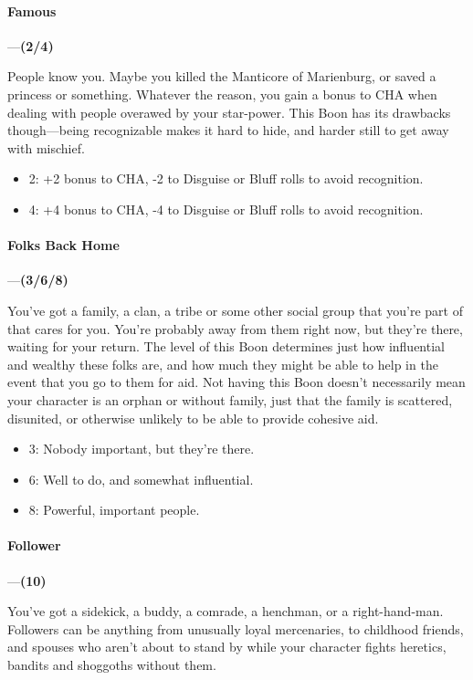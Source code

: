 \documentclass[oneside,11pt,english]{book}
\begin{document}
\paragraph{\label{boon:Famous}Famous}---\quad\textbf{(2/4)}\par
People know you. Maybe you killed the Manticore of Marienburg, or saved a princess or something. 
Whatever the reason, you gain a bonus to CHA when dealing with people overawed by your star-power. 
This Boon has its drawbacks though—being recognizable makes it hard to hide, and harder still to get 
away with mischief.
\begin{itemize}
\item 2: +2 bonus to CHA, -2 to Disguise or Bluff rolls to avoid recognition. 
\item 4: +4 bonus to CHA, -4 to Disguise or Bluff rolls to avoid recognition. 
\end{itemize}
\paragraph{\label{boon:Folks Back Home}Folks Back Home}---\quad\textbf{(3/6/8)}\par
You've got a family, a clan, a tribe or some other social group that you're part of that cares for you. You're 
probably away from them right now, but they're there, waiting for your return. The level of this Boon 
determines just how influential and wealthy these folks are, and how much they might be able to help in 
the event that you go to them for aid. Not having this Boon doesn't necessarily mean your character is an 
orphan or without family, just that the family is scattered, disunited, or otherwise unlikely to be able to 
provide cohesive aid. 
\begin{itemize}
\item 3: Nobody important, but they’re there. 
\item 6: Well to do, and somewhat influential. 
\item 8: Powerful, important people.
\end{itemize}
\paragraph{\label{boon:Follower}Follower}---\quad\textbf{(10)}\par
You've got a sidekick, a buddy, a comrade, a henchman, or a right-hand-man. Followers can be anything 
from unusually loyal mercenaries, to childhood friends, and spouses who aren't about to stand by while 
your character fights heretics, bandits and shoggoths without them. 
\end{document}
